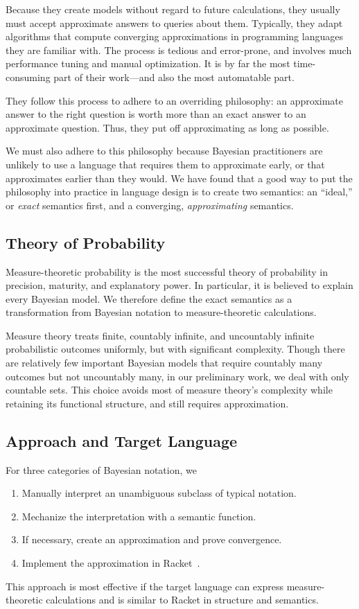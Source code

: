 Because they create models without regard to future calculations, they usually must accept approximate answers to queries about them. Typically, they adapt algorithms that compute converging approximations in programming languages they are familiar with. The process is tedious and error-prone, and involves much performance tuning and manual optimization. It is by far the most time-consuming part of their work---and also the most automatable part.

They follow this process to adhere to an overriding philosophy: an approximate answer to the right question is worth more than an exact answer to an approximate question. Thus, they put off approximating  as long as possible.

We must also adhere to this philosophy because Bayesian practitioners are unlikely to use a language that requires them to approximate early, or that approximates earlier than they would. We have found that a good way to put the philosophy into practice in language design is to create two semantics: an ``ideal,'' or \textit{exact} semantics first, and a converging, \textit{approximating} semantics.

\subsection{Theory of Probability}

Measure-theoretic probability is the most successful theory of probability in precision, maturity, and explanatory power. In particular, it is believed to explain every Bayesian model. We therefore define the exact semantics as a transformation from Bayesian notation to measure-theoretic calculations.

Measure theory treats finite, countably infinite, and uncountably infinite probabilistic outcomes uniformly, but with significant complexity. Though there are relatively few important Bayesian models that require countably many outcomes but not uncountably many, in our preliminary work, we deal with only countable sets. This choice avoids most of measure theory's complexity while retaining its functional structure, and still requires approximation.

\subsection{Approach and Target Language}

For three categories of Bayesian notation, we
\begin{enumerate}
	\item Manually interpret an unambiguous subclass of typical notation.
	\item Mechanize the interpretation with a semantic function.
	\item If necessary, create an approximation and prove convergence.
	\item Implement the approximation in Racket~\cite{cit:racket-lang}.
\end{enumerate}
This approach is most effective if the target language can express measure-theoretic calculations and is similar to Racket in structure and semantics.

